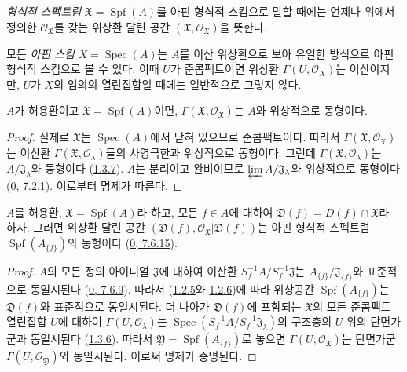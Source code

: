 \emph{형식적 스펙트럼} $\mathfrak{X}=\operatorname{Spf}(A)$를 아핀 형식적
스킴으로 말할 때에는 언제나 위에서 정의한
$\mathscr{O}_{\mathfrak{X}}$를 갖는 위상환 달린 공간
$(\mathfrak{X},\mathscr{O}_{\mathfrak{X}})$을 뜻한다.

모든 \emph{아핀 스킴} $X=\operatorname{Spec}(A)$는 $A$를 이산
위상환으로 보아 유일한 방식으로 아핀 형식적 스킴으로 볼 수 있다. 이때
$U$가 준콤팩트이면 위상환 $\Gamma(U,\mathscr{O}_X)$는 이산이지만,
$U$가 $X$의 임의의 열린집합일 때에는 일반적으로 그렇지 않다.

\begin{proposition}[10.1.3]
\label{I.10.1.3-ko}
$A$가 허용환이고 $\mathfrak{X}=\operatorname{Spf}(A)$이면,
$\Gamma(\mathfrak{X},\mathscr{O}_{\mathfrak{X}})$는 $A$와 위상적으로
동형이다.
\end{proposition}

\begin{proof}
실제로 $\mathfrak{X}$는 $\operatorname{Spec}(A)$에서 닫혀 있으므로
준콤팩트이다. 따라서
$\Gamma(\mathfrak{X},\mathscr{O}_{\mathfrak{X}})$는 이산환
$\Gamma(\mathfrak{X},\mathscr{O}_\lambda)$들의 사영극한과 위상적으로
동형이다. 그런데 $\Gamma(\mathfrak{X},\mathscr{O}_\lambda)$는
$A/\mathfrak{J}_\lambda$와 동형이다
(\hyperref[I.1.3.7-ko]{1.3.7}). $A$는 분리이고 완비이므로
$\varprojlim A/\mathfrak{J}_\lambda$와 위상적으로 동형이다
(\hyperref[0.7.2.1-ko]{0, 7.2.1}). 이로부터 명제가 따른다.
\end{proof}

\begin{proposition}[10.1.4]
\label{I.10.1.4-ko}
$A$를 허용환, $\mathfrak{X}=\operatorname{Spf}(A)$라 하고, 모든
$f\in A$에 대하여 $\mathfrak{D}(f)=D(f)\cap\mathfrak{X}$라 하자. 그러면
위상환 달린 공간
$(\mathfrak{D}(f),\mathscr{O}_{\mathfrak{X}}|\mathfrak{D}(f))$는 아핀
형식적 스펙트럼 $\operatorname{Spf}(A_{\{f\}})$와 동형이다
(\hyperref[0.7.6.15-ko]{0, 7.6.15}).
\end{proposition}

\begin{proof}
$A$의 모든 정의 아이디얼 $\mathfrak{J}$에 대하여 이산환
$S_f^{-1}A/S_f^{-1}\mathfrak{J}$는
$A_{\{f\}}/\mathfrak{J}_{\{f\}}$와 표준적으로 동일시된다
(\hyperref[0.7.6.9-ko]{0, 7.6.9}). 따라서
(\hyperref[I.1.2.5-ko]{1.2.5}와 \hyperref[I.1.2.6-ko]{1.2.6})에 따라 위상공간
$\operatorname{Spf}(A_{\{f\}})$는 $\mathfrak{D}(f)$와 표준적으로
동일시된다. 더 나아가 $\mathfrak{D}(f)$에 포함되는
$\mathfrak{X}$의 모든 준콤팩트 열린집합 $U$에 대하여
$\Gamma(U,\mathscr{O}_\lambda)$는
$\operatorname{Spec}(S_f^{-1}A/S_f^{-1}\mathfrak{J}_\lambda)$의 구조층의
$U$ 위의 단면가군과 동일시된다
(\hyperref[I.1.3.6-ko]{1.3.6}). 따라서
$\mathfrak{Y}=\operatorname{Spf}(A_{\{f\}})$로 놓으면
$\Gamma(U,\mathscr{O}_{\mathfrak{X}})$는 단면가군
$\Gamma(U,\mathscr{O}_{\mathfrak{Y}})$와 동일시된다. 이로써 명제가
증명된다.
\end{proof}

